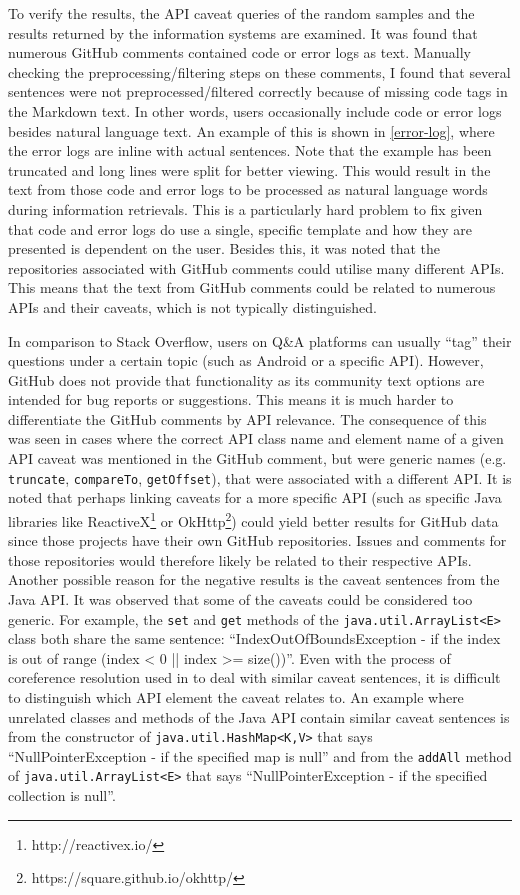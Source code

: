 To verify the results, the API caveat queries of the random samples and the results returned by the information systems are examined. It was found that numerous GitHub comments contained code or error logs as text. Manually checking the preprocessing/filtering steps on these comments, I found that several sentences were not preprocessed/filtered correctly because of missing code tags in the Markdown text. In other words, users occasionally include code or error logs besides natural language text. An example of this is shown in \ref{error-log}, where the error logs are inline with actual sentences. Note that the example has been truncated and long lines were split for better viewing. This would result in the text from those code and error logs to be processed as natural language words during information retrievals. This is a particularly hard problem to fix given that code and error logs do use a single, specific template and how they are presented is dependent on the user. Besides this, it was noted that the repositories associated with GitHub comments could utilise many different APIs. This means that the text from GitHub comments could be related to numerous APIs and their caveats, which is not typically distinguished. \bigbreak

In comparison to Stack Overflow, users on Q\&A platforms can usually ``tag'' their questions under a certain topic (such as Android or a specific API). However, GitHub does not provide that functionality as its community text options are intended for bug reports or suggestions. This means it is much harder to differentiate the GitHub comments by API relevance. The consequence of this was seen in cases where the correct API class name and element name of a given API caveat was mentioned in the GitHub comment, but were generic names (e.g. \lstinline{truncate}, \lstinline{compareTo}, \lstinline{getOffset}), that were associated with a different API. It is noted that perhaps linking caveats for a more specific API (such as specific Java libraries like ReactiveX\footnote{http://reactivex.io/} or OkHttp\footnote{https://square.github.io/okhttp/}) could yield better results for GitHub data since those projects have their own GitHub repositories. Issues and comments for those repositories would therefore likely be related to their respective APIs. Another possible reason for the negative results is the caveat sentences from the Java API. It was observed that some of the caveats could be considered too generic. For example, the \lstinline{set} and \lstinline{get} methods of the \lstinline{java.util.ArrayList<E>} class both share the same sentence: ``IndexOutOfBoundsException - if the index is out of range (index < 0 || index >= size())''. Even with the process of coreference resolution used in \cite{jiamou} to deal with similar caveat sentences, it is difficult to distinguish which API element the caveat relates to.
An example where unrelated classes and methods of the Java API contain similar caveat sentences is from the constructor of \lstinline{java.util.HashMap<K,V>} that says ``NullPointerException - if the specified map is null'' and from the \lstinline{addAll} method of \lstinline{java.util.ArrayList<E>} that says ``NullPointerException - if the specified collection is null''. \bigbreak

